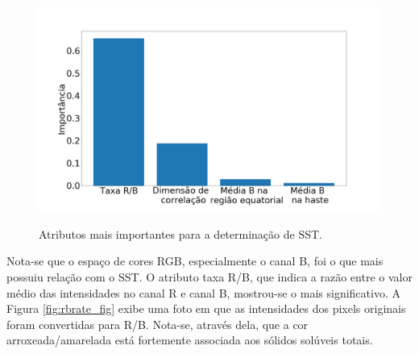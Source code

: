 \begin{figure}[H]
\centering
	\caption{Atributos mais importantes para a determinação de SST.}
	\includegraphics[scale=0.18]{img/feat_import_sst_palmer.png}
	\label{fig:feat_import}
\end{figure}

Nota-se que o espaço de cores RGB, especialmente o canal B, foi o que mais possuiu relação com o SST. O atributo taxa R/B, que indica a razão entre o valor médio das intensidades no canal R e canal B, mostrou-se o mais significativo. A Figura \ref{fig:rbrate_fig} exibe uma foto em que as intensidades dos pixels originais foram convertidas para R/B. Nota-se, através dela, que a cor arroxeada/amarelada está fortemente associada aos sólidos solúveis totais.

